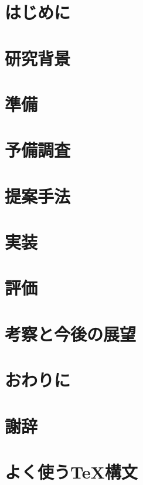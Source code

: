 \documentclass[10pt]{jreport}
\begin{document}
\maketitle


\clearpage
\tableofcontents
\clearpage



\chapter{はじめに}

\clearpage


\chapter{研究背景}

\clearpage

\chapter{準備}

\clearpage

\chapter{予備調査}

\clearpage

\chapter{提案手法}

\clearpage

\chapter{実装}

\clearpage

\chapter{評価}

\clearpage

\chapter{考察と今後の展望}

\clearpage

\chapter{おわりに}

\clearpage

\chapter*{謝辞}

\clearpage

\renewcommand{\bibname}{参考文献}


\clearpage

\appendix
\chapter{よく使うTeX構文}

\end{document}
